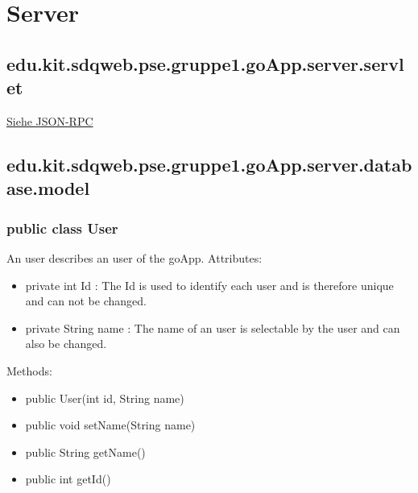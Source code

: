 
\section{Server}
	\subsection{edu.kit.sdqweb.pse.gruppe1.goApp.server.servlet}
	\hyperlink{Servlets}{Siehe JSON-RPC}
	\subsection{edu.kit.sdqweb.pse.gruppe1.goApp.server.database.model}

	\subsubsection{public class User}
	An user describes an user of the goApp.
	\newline Attributes:
	\begin{itemize}
	\item private int Id : The Id is used to identify each user and is therefore unique and can not be changed.
	\item private String name : The name of an user is selectable by the user and can also be changed.
	\end{itemize}
	Methods: 
	\begin{itemize}
	\item public User(int id, String name)
	\item public void setName(String name)
	\item public String getName()
	\item public int getId()
	\end{itemize}

